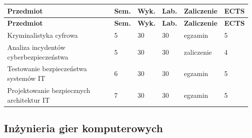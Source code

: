 \documentclass[12pt,a4paper]{article}
\newcommand{\thdrule}{\noalign{\global\setlength{\extrarowheight}{0pt}}}
\newcommand{\thdend}{\noalign{\global\setlength{\extrarowheight}{4pt}}}
\begin{document}
{\scriptsize
\begin{longtable}{m{6.5cm}m{0.7cm}m{1cm}m{1cm}m{1.7cm}m{0.7cm}}
\thdrule\toprule
\rowcolor{pjatkRed}
{\color{white}\footnotesize\textbf{\vphantom{Ag}Przedmiot}} & {\color{white}\footnotesize\textbf{\vphantom{Ag}Sem.}} & {\color{white}\footnotesize\textbf{\vphantom{Ag}Wyk.}} & {\color{white}\footnotesize\textbf{\vphantom{Ag}Lab.}} & {\color{white}\footnotesize\textbf{\vphantom{Ag}Zaliczenie}} & {\color{white}\footnotesize\textbf{\vphantom{Ag}ECTS}} \\
\midrule\thdend
\endfirsthead
\thdrule\toprule
\rowcolor{pjatkRed}
{\color{white}\footnotesize\textbf{\vphantom{Ag}Przedmiot}} & {\color{white}\footnotesize\textbf{\vphantom{Ag}Sem.}} & {\color{white}\footnotesize\textbf{\vphantom{Ag}Wyk.}} & {\color{white}\footnotesize\textbf{\vphantom{Ag}Lab.}} & {\color{white}\footnotesize\textbf{\vphantom{Ag}Zaliczenie}} & {\color{white}\footnotesize\textbf{\vphantom{Ag}ECTS}} \\
\midrule\thdend
\endhead
\rowcolor{tableRowLight} Kryminalistyka cyfrowa & 5 & 30 & 30 & {\scriptsize egzamin} & 5 \\
\rowcolor{tableRowAlt} Analiza incydentów cyberbezpieczeństwa & 5 & 30 & 30 & {\scriptsize zaliczenie} & 4 \\
\rowcolor{tableRowLight} Testowanie bezpieczeństwa systemów IT & 6 & 30 & 30 & {\scriptsize egzamin} & 5 \\
\rowcolor{tableRowAlt} Projektowanie bezpiecznych architektur IT & 7 & 30 & 30 & {\scriptsize egzamin} & 5 \\
\bottomrule
\end{longtable}}

\subsection*{Inżynieria gier komputerowych}
\end{document}
